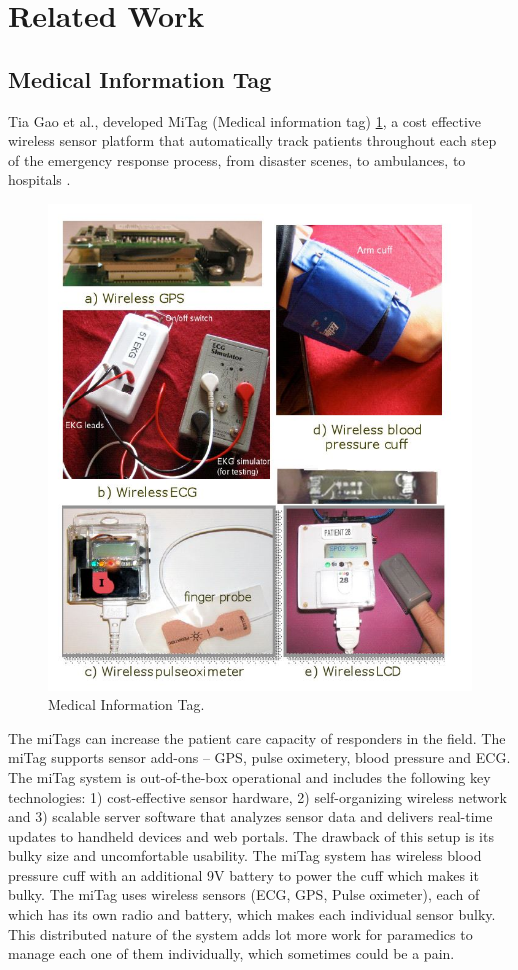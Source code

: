 \section{Related Work}

\subsection{Medical Information Tag}
Tia Gao et al., developed MiTag (Medical information tag) \ref{fig:miTag}, a cost effective 
wireless sensor platform that automatically track patients 
throughout each step of the emergency response process, from disaster scenes, to ambulances, to hospitals \cite{miTag}.
\begin{figure}[h]
	\centering
	\includegraphics[scale = 0.6 ]{miTag.JPG}
	\caption{Medical Information Tag. \cite{miTag}\label{fig:miTag}}
\end{figure}
The miTags can increase 
the patient care capacity of responders in the field. The miTag supports sensor add-ons – GPS, pulse oximetery, blood pressure and ECG. 
The miTag system is out-of-the-box operational and includes the following key technologies: 1) cost-effective sensor hardware, 2) 
self-organizing wireless network and 3) scalable server software that analyzes sensor data and delivers real-time updates to handheld devices and web portals. The drawback of this setup is its bulky size and uncomfortable usability. The miTag system has wireless blood pressure cuff with an additional 9V battery to power the cuff which makes it bulky. The miTag uses wireless sensors (ECG, GPS, Pulse oximeter), each of which has its own radio and battery, which makes each individual sensor bulky. This distributed nature of the system adds lot more work for paramedics to manage each one of them individually, which sometimes could be a pain. 
